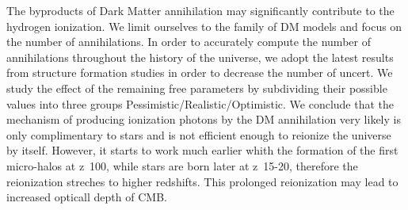 The byproducts of Dark Matter annihilation may significantly contribute to the hydrogen ionization. We limit ourselves to the family of DM models and focus on the number of annihilations. In order to accurately compute the number of annihilations throughout the history of the universe, we adopt the latest results from structure formation studies in order to decrease the number of uncert. We study the effect of the remaining free parameters by subdividing their possible values into three groups Pessimistic/Realistic/Optimistic. We conclude that the mechanism of producing ionization photons by the DM annihilation very likely is only complimentary to stars and is not efficient enough to reionize the universe by itself. However, it starts to work much earlier whith the formation of the first micro-halos at z~100, while stars are born later at z~15-20, therefore the reionization streches to higher redshifts. This prolonged reionization may lead to increased opticall depth of CMB.
  